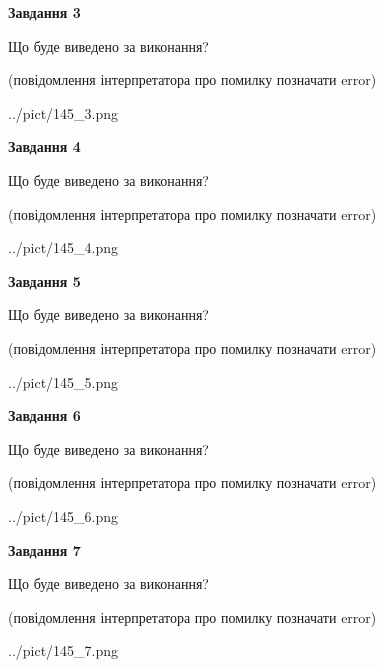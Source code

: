 \documentclass[12pt, ukrainian]{article}
\begin{document}
{\begin {large}
{\begin {center}\textbf{Завдання 3}\end {center}}\par
Що буде виведено за виконання?\par
 (повідомлення інтерпретатора про помилку позначати error)\par
\begin{center}
	{../pict/145_3.png}
\end{center}
\newpage

{\begin {center}\textbf{Завдання 4}\end {center}}\par
Що буде виведено за виконання?\par
 (повідомлення інтерпретатора про помилку позначати error)\par
\begin{center}
	{../pict/145_4.png}
\end{center}
\newpage

{\begin {center}\textbf{Завдання 5}\end {center}}\par
Що буде виведено за виконання?\par
 (повідомлення інтерпретатора про помилку позначати error)\par
\begin{center}
	{../pict/145_5.png}
\end{center}
\newpage

{\begin {center}\textbf{Завдання 6}\end {center}}\par
Що буде виведено за виконання?\par
 (повідомлення інтерпретатора про помилку позначати error)\par
\begin{center}
	{../pict/145_6.png}
\end{center}
\newpage

{\begin {center}\textbf{Завдання 7}\end {center}}\par
Що буде виведено за виконання?\par
 (повідомлення інтерпретатора про помилку позначати error)\par
\begin{center}
	{../pict/145_7.png}
\end{center}
\newpage


\end{large}}
\end{document}
